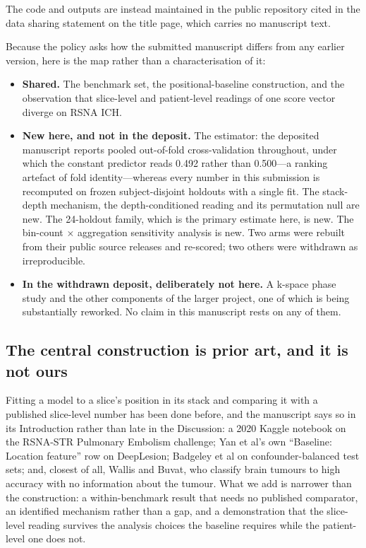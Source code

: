 \documentclass[11pt,letterpaper]{article}
\begin{document}
The code and outputs are instead maintained in the public repository cited in the
data sharing statement on the title page, which carries no manuscript text.

Because the policy asks how the submitted manuscript differs from any earlier
version, here is the map rather than a characterisation of it:

\begin{itemize}\setlength{\itemsep}{0.15em}
\item \textbf{Shared.} The benchmark set, the positional-baseline construction,
and the observation that slice-level and patient-level readings of one score
vector diverge on RSNA ICH.
\item \textbf{New here, and not in the deposit.} The estimator: the deposited
manuscript reports pooled out-of-fold cross-validation throughout, under which
the constant predictor reads 0.492 rather than 0.500---a ranking artefact of fold
identity---whereas every number in this submission is recomputed on frozen
subject-disjoint holdouts with a single fit. The stack-depth mechanism, the
depth-conditioned reading and its permutation null are new. The 24-holdout
family, which is the primary estimate here, is new. The bin-count $\times$
aggregation sensitivity analysis is new. Two arms were rebuilt from their public
source releases and re-scored; two others were withdrawn as irreproducible.
\item \textbf{In the withdrawn deposit, deliberately not here.} A k-space phase
study and the other components of the larger project, one of which is being
substantially reworked. No claim in this manuscript rests on any of them.
\end{itemize}

\subsection*{The central construction is prior art, and it is not ours}

Fitting a model to a slice's position in its stack and comparing it with a
published slice-level number has been done before, and the manuscript says so in
its Introduction rather than late in the Discussion: a 2020 Kaggle notebook on
the RSNA-STR Pulmonary Embolism challenge; Yan et al's own ``Baseline: Location
feature'' row on DeepLesion; Badgeley et al on confounder-balanced test sets; and,
closest of all, Wallis and Buvat, who classify brain tumours to high accuracy
with no information about the tumour. What we add is narrower than the
construction: a within-benchmark result that needs no published comparator, an
identified mechanism rather than a gap, and a demonstration that the slice-level
reading survives the analysis choices the baseline requires while the
patient-level one does not.
\end{document}
